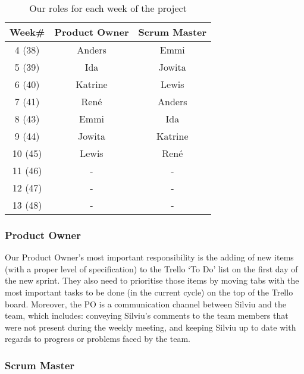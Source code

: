 \begin{table}[h!]
\centering
\begin{tabular}{@{}ccc@{}}
\toprule
\textbf{Week\#} & \textbf{Product Owner} & \textbf{Scrum Master} \\ \midrule
4 (38)          & Anders                 & Emmi                  \\ \midrule
5 (39)          & Ida                    & Jowita                \\ \midrule
6 (40)          & Katrine                & Lewis                 \\ \midrule
7 (41)          & René                   & Anders                \\ \midrule
8 (43)          & Emmi                   & Ida                   \\ \midrule
9 (44)          & Jowita                 & Katrine               \\ \midrule
10 (45)         & Lewis                  & René                  \\ \midrule
11 (46)         & -                      & -                     \\ \midrule
12 (47)         & -                      & -                     \\ \midrule
13 (48)         & -                      & -                     \\ \bottomrule
\end{tabular}
\caption{Our roles for each week of the project}
\label{table_roles}
\end{table}

\subsubsection{Product Owner}

Our Product Owner’s most important responsibility is the adding of new items (with a proper level of specification) to the Trello ‘To Do’ list on the first day of the new sprint. They also need to prioritise those items by moving tabs with the most important tasks to be done (in the current cycle) on the top of the Trello board. Moreover, the PO is a communication channel between Silviu and the team, which includes: conveying Silviu's comments to the team members that were not present during the weekly meeting, and keeping Silviu up to date with regards to progress or problems faced by the team.

\subsubsection{Scrum Master}

